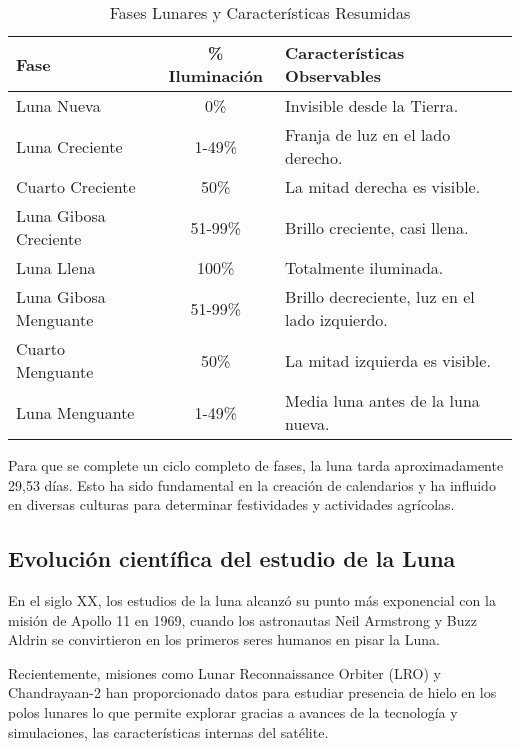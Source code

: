\begin{table}[h]
    \centering
    \renewcommand{\arraystretch}{1.2} %
    \begin{tabular}{|l|c|p{7cm}|}
        \hline
        \textbf{Fase} & \textbf{\% Iluminación} & \textbf{Características Observables} \\
        \hline
        Luna Nueva & 0\% & Invisible desde la Tierra. \\
        \hline
        Luna Creciente & 1-49\% & Franja de luz en el lado derecho. \\
        \hline
        Cuarto Creciente & 50\% & La mitad derecha es visible. \\
        \hline
        Luna Gibosa Creciente & 51-99\% & Brillo creciente, casi llena. \\
        \hline
        Luna Llena & 100\% & Totalmente iluminada. \\
        \hline
        Luna Gibosa Menguante & 51-99\% & Brillo decreciente, luz en el lado izquierdo. \\
        \hline
        Cuarto Menguante & 50\% & La mitad izquierda es visible. \\
        \hline
        Luna Menguante & 1-49\% & Media luna antes de la luna nueva. \\
        \hline
    \end{tabular}
    \caption{Fases Lunares y Características Resumidas}
    \label{tabla:fases_lunares}
\end{table}

Para que se complete un ciclo completo de fases, la luna tarda aproximadamente 29,53 días. Esto ha sido fundamental en la creación de calendarios y ha influido en diversas culturas para determinar
festividades y actividades agrícolas.

\subsection*{Evolución científica del estudio de la Luna}

En el siglo XX, los estudios de la luna alcanzó su punto más exponencial con la misión de Apollo 11 en 1969, cuando
los astronautas Neil Armstrong y Buzz Aldrin se convirtieron en los primeros seres humanos en pisar la Luna.

Recientemente, misiones como  Lunar Reconnaissance Orbiter (LRO) y Chandrayaan-2 \cite{Singh2022} han proporcionado datos para
estudiar presencia de hielo en los polos lunares lo que permite explorar gracias a avances de la tecnología y simulaciones, las
características internas del satélite.

